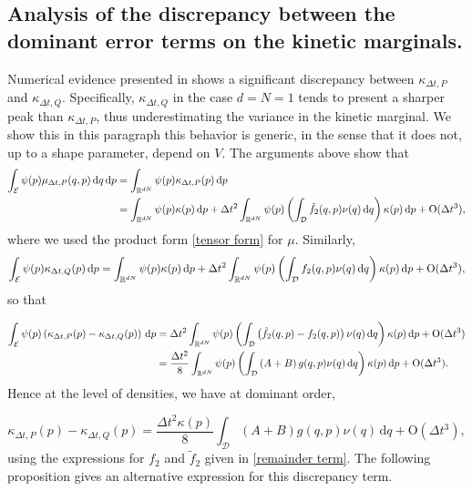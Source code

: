 \subsection{Analysis of the discrepancy between the dominant error terms on the kinetic marginals.}\label{discrepancy term kinetic}
Numerical evidence presented in \cite{KK22} shows a significant discrepancy between $\kappa_{\Delta t,P}$ and $\kappa_{\Delta t,Q}$.
Specifically, $\kappa_{\Delta t,Q}$ in the case $d=N=1$ tends to present a sharper peak than $\kappa_{\Delta t,P}$, thus underestimating the variance in the kinetic marginal.
 We show this in this paragraph this behavior is generic, in the sense that it does not, up to a shape parameter, depend on $V$.
The arguments above show that
\begin{equation}
  \begin{aligned}
    \int_{\mathcal E}\psi(p)\mu_{\Delta t,P}(q,p)\,\mathrm{d}q\,\mathrm{d}p&=\int_{\mathbb{R}^{dN}}\psi(p)\kappa_{\Delta t,P}(p)\,\mathrm{d}p\\
    &=\int_{\mathbb{R}^{dN}}\psi(p)\kappa(p)\,\mathrm{d}p+\Delta t^2\int_{\mathbb{R}^{dN}}\psi(p)\left(\int_{\mathcal D} \tilde f_2(q,p)\nu(q)\,\mathrm{d}q\right)\kappa(p)\,\mathrm{d}p +\mathrm{O}(\Delta t^3),  
  \end{aligned}
\end{equation}
where we used the product form \eqref{tensor form} for $\mu$. Similarly,
\begin{equation}
  \int_{\mathcal E}\psi(p)\kappa_{\Delta t,Q}(p)\,\mathrm{d}p=\int_{\mathbb{R}^{dN}}\psi(p)\kappa(p)\,\mathrm{d}p+\Delta t^2\int_{\mathbb{R}^{dN}}\psi(p)\left(\int_{\mathcal D}f_2(q,p)\nu(q)\,\mathrm{d}q\right)\kappa(p)\,\mathrm{d}p +\mathrm{O}(\Delta t^3),
\end{equation}
so that 

\begin{align*}
  \int_{\mathcal E}\psi(p)\left(\kappa_{\Delta t,P}(p)-\kappa_{\Delta t,Q}(p)\right)\,\mathrm{d}p&=\Delta t^2\int_{\mathbb{R}^{dN}}\psi(p)\left(\int_{\mathcal D}\left(\tilde f_2(q,p)-f_2(q,p)\right)\nu(q)\,\mathrm{d}q\right)\kappa(p)\,\mathrm{d}p +\mathrm{O}(\Delta t^3)\\
  &=\frac{\Delta t^2}8\int_{\mathbb{R}^{dN}}\psi(p)\left(\int_{\mathcal D}\left(A+B\right)g(q,p)\nu(q)\,\mathrm{d}q\right)\kappa(p)\,\mathrm{d}p +\mathrm{O}(\Delta t^3).
\end{align*}
Hence at the level of densities, we have at dominant order,

$$ \kappa_{\Delta t,P}(p)- \kappa_{\Delta t,Q}(p)=\frac{\Delta t^2\kappa(p)}8\int_{\mathcal D}\left(A+B\right)g(q,p)\nu(q)\,\mathrm{d}q + \mathrm{O}(\Delta t^3),$$
using the expressions for $f_2$ and $\tilde f_2$ given in \eqref{remainder term}. The following proposition gives an alternative expression for this discrepancy term.

